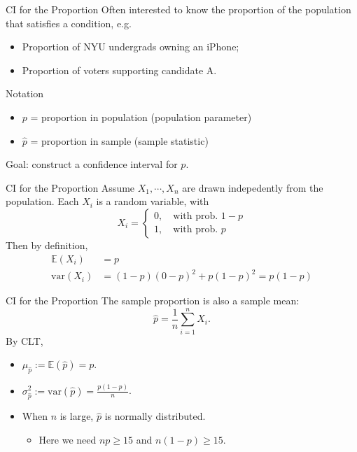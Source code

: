 \documentclass{beamer}
\newcommand{\E}{\mathbb{E}}
\newcommand{\var}{\text{var}}
\newcommand{\h}{\widehat}
\let\thefootnote\relax\footnotetext{\tiny{*  Office Hours: Wed \& Fri 10:00 - 11:30 AM, KMC 8-174}}
\begin{document}
\begin{frame}{CI for the Proportion}
Often interested to know the proportion of the population that satisfies a condition, e.g.
\begin{itemize}
\item Proportion of NYU undergrads owning an iPhone;
\item Proportion of voters supporting candidate A.
\end{itemize}

Notation
\begin{itemize}
\item $p$ = proportion in population (population parameter)
\item $\h p$  = proportion in sample (sample statistic)
\end{itemize}

Goal: construct a confidence interval for $p$.
\end{frame}


\begin{frame}{CI for the Proportion}
Assume $X_1,\cdots,X_n$ are drawn indepedently from the population. Each $X_i$ is a random variable, with
\[
X_i=\begin{cases}
0, \quad \text{with prob. } 1- p\\
        1, \quad \text{with prob. }  p
        \end{cases}
\]
Then by definition,
\begin{align*}
\E (X_i) &= p \\
\var (X_i) & = (1-p) (0 -p)^2 + p (1-p)^2 = p(1-p)
\end{align*}
\end{frame}

\begin{frame}{CI for the Proportion}
The sample proportion is also a sample mean:
\[
\h p=\frac{1}{n} \sum_{i=1}^n X_i.
\]
By CLT,
\begin{itemize}
\item $\mu_{\h p} := \E (\h p) = p $.
\item $\sigma^2_{\h p} := \var (\h p)  = \frac{p(1-p)}{n}$.
\item When $n$ is large, $\h p$ is normally distributed.
\begin{itemize}
\item Here we need $np\geq 15$ and $n(1-p)\geq 15$.
\end{itemize}
\end{itemize}
\let\thefootnote\relax{}
\end{frame}
\end{document}

